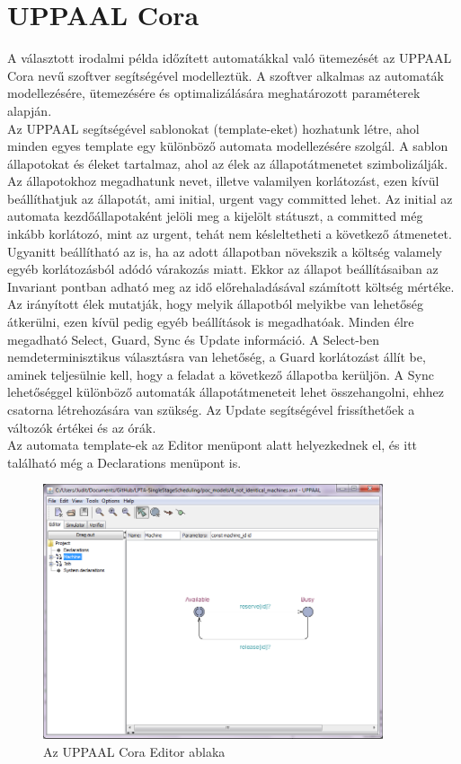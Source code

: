 \documentclass {report}
\begin{document}
\section{UPPAAL Cora}
A választott irodalmi példa időzített automatákkal való ütemezését az UPPAAL Cora nevű szoftver segítségével modelleztük. A szoftver alkalmas az automaták modellezésére, ütemezésére és optimalizálására meghatározott paraméterek alapján. \\
Az UPPAAL segítségével sablonokat (template-eket) hozhatunk létre, ahol minden egyes template egy különböző automata modellezésére szolgál. A sablon állapotokat és éleket tartalmaz, ahol az élek az állapotátmenetet szimbolizálják. \\
Az állapotokhoz megadhatunk nevet, illetve valamilyen korlátozást, ezen kívül beállíthatjuk az állapotát, ami initial, urgent vagy committed lehet. Az initial az automata kezdőállapotaként jelöli meg a kijelölt státuszt, a committed még inkább korlátozó, mint az urgent, tehát nem késleltetheti a következő átmenetet. Ugyanitt beállítható az is, ha az adott állapotban növekszik a költség valamely egyéb korlátozásból adódó várakozás miatt. Ekkor az állapot beállításaiban az Invariant pontban adható meg az idő előrehaladásával számított költség mértéke. \\
Az irányított élek mutatják, hogy melyik állapotból melyikbe van lehetőség átkerülni, ezen kívül pedig egyéb beállítások is megadhatóak. Minden élre megadható  Select, Guard, Sync és Update információ. A Select-ben nemdeterminisztikus választásra van lehetőség, a Guard korlátozást állít be, aminek teljesülnie kell, hogy a feladat a következő állapotba kerüljön. A Sync lehetőséggel különböző automaták állapotátmeneteit lehet összehangolni, ehhez csatorna létrehozására van szükség. Az Update segítségével frissíthetőek a változók értékei és az órák.\\
Az automata template-ek az Editor menüpont alatt helyezkednek el, és itt található még a Declarations menüpont is. 
\begin{figure}
\begin{center}
\includegraphics[width=10cm]{uppaal2}
 \caption{Az UPPAAL Cora Editor ablaka}
\end{center}
\end{figure}
\end{document}
